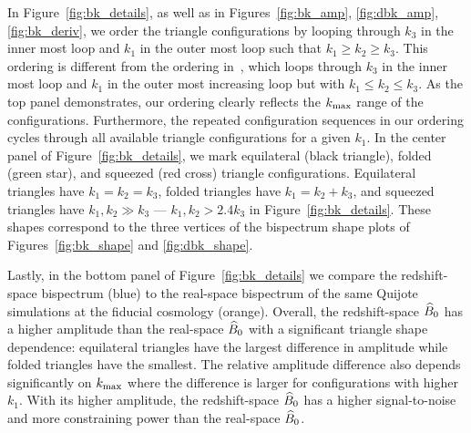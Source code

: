 In Figure~\ref{fig:bk_details}, as well as in Figures~\ref{fig:bk_amp}, \ref{fig:dbk_amp}, 
\ref{fig:bk_deriv}, we order the triangle configurations by looping through 
$k_3$ in the inner most loop and $k_1$ in the outer most loop such that 
$k_1 \geq k_2 \geq k_3$. This ordering is different from the ordering in~\cite{gil-marin2017}, 
which loops through $k_3$ in the inner most loop and $k_1$ in the outer most 
increasing loop but with $k_1 \leq k_2 \leq k_3$. As the top panel demonstrates, 
our ordering clearly reflects the $k_{\rm max}$ range of the configurations. 
Furthermore, the repeated configuration sequences in our ordering cycles through
all available triangle configurations for a given $k_1$. In the center panel 
of Figure~\ref{fig:bk_details}, we mark equilateral (black triangle), folded 
(green star), and squeezed (red cross) triangle configurations. Equilateral 
triangles have $k_1 = k_2 = k_3$, folded triangles have $k_1 = k_2 + k_3$, and 
squeezed triangles have $k_1, k_2 \gg k_3$ --- $k_1, k_2 > 2.4k_3$ in Figure~\ref{fig:bk_details}. 
These shapes correspond to the three vertices of the bispectrum shape plots of 
Figures~\ref{fig:bk_shape} and \ref{fig:dbk_shape}. 

Lastly, in the bottom panel of Figure~\ref{fig:bk_details} we compare the 
redshift-space bispectrum (blue) to the real-space bispectrum of the same 
Quijote simulations at the fiducial cosmology (orange). Overall, the 
redshift-space $\widehat{B}_0$ has a higher amplitude than the real-space $\widehat{B}_0$ with 
a significant triangle shape dependence: equilateral triangles have the 
largest difference in amplitude while folded triangles have the smallest. 
The relative amplitude difference also depends significantly on $k_{\rm max}$ 
where the difference is larger for configurations with higher $k_1$. With 
its higher amplitude, the redshift-space $\widehat{B}_0$ has a higher signal-to-noise 
and more constraining power than the real-space $\widehat{B}_0$.  
